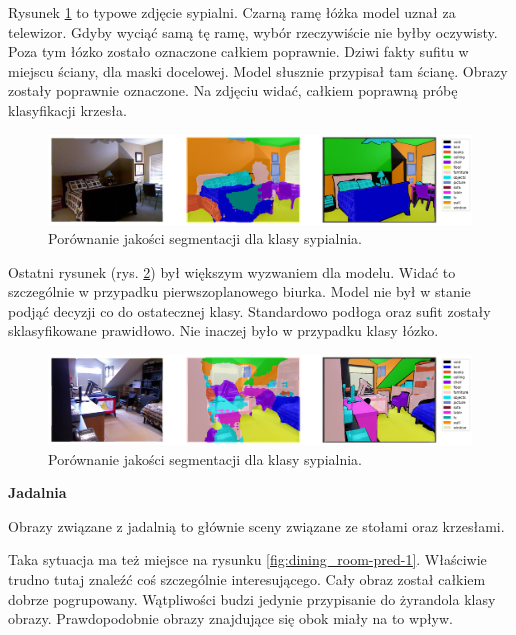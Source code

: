 Rysunek \ref{fig:bedroom-pred-2} to typowe zdjęcie sypialni. Czarną ramę łóżka model uznał za telewizor. Gdyby wyciąć samą tę ramę, wybór rzeczywiście nie byłby oczywisty. Poza tym łózko zostało oznaczone całkiem poprawnie. Dziwi fakty sufitu w miejscu ściany, dla maski docelowej. Model słusznie przypisał tam ścianę. Obrazy zostały poprawnie oznaczone. Na zdjęciu widać, całkiem poprawną próbę klasyfikacji krzesła.

\begin{figure}[ht!]
    \centering
    \includegraphics[width=\textwidth]{img/preds_analysis/gt_vs_pred/bedroom-2.png}
    \caption{Porównanie jakości segmentacji dla klasy sypialnia.}
    \label{fig:bedroom-pred-2}
\end{figure}

Ostatni rysunek (rys. \ref{fig:bedroom-pred-3}) był większym wyzwaniem dla modelu. Widać to szczególnie w przypadku pierwszoplanowego biurka. Model nie był w stanie podjąć decyzji co do ostatecznej klasy. Standardowo podłoga oraz sufit zostały sklasyfikowane prawidłowo. Nie inaczej było w przypadku klasy łózko.
\begin{figure}[ht!]
    \centering
    \includegraphics[width=\textwidth]{img/preds_analysis/gt_vs_pred/bedroom-3.png}
    \caption{Porównanie jakości segmentacji dla klasy sypialnia.}
    \label{fig:bedroom-pred-3}
\end{figure}

\noindent
\textbf{Jadalnia}


Obrazy związane z jadalnią to głównie sceny związane ze stołami oraz krzesłami.

Taka sytuacja ma też miejsce na rysunku \ref{fig:dining_room-pred-1}. Właściwie trudno tutaj znaleźć coś szczególnie interesującego. Cały obraz został całkiem dobrze pogrupowany. Wątpliwości budzi jedynie przypisanie do żyrandola klasy obrazy. Prawdopodobnie obrazy znajdujące się obok miały na to wpływ.


